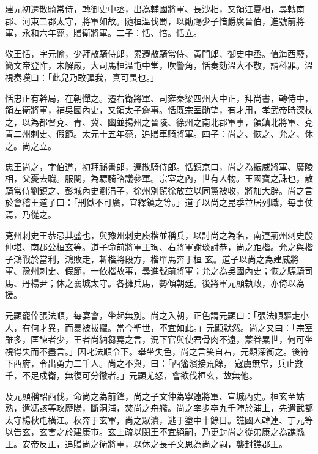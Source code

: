 \begin{pinyinscope}
 建元初遷散騎常侍，轉御史中丞，出為輔國將軍、長沙相，又領江夏相，尋轉南郡、河東二郡太守，將軍如故。隨桓溫伐蜀，以勛賜少子愔爵廣晉伯，進號前將軍，永和六年薨，贈衛將軍。二子：恬、愔。恬立。



 敬王恬，字元愉，少拜散騎侍郎，累遷散騎常侍、黃門郎、御史中丞。值海西廢，簡文帝登阼，未解嚴，大司馬桓溫屯中堂，吹警角，恬奏劾溫大不敬，請科罪。溫視奏嘆曰：「此兒乃敢彈我，真可畏也。」



 恬忠正有幹局，在朝憚之。遷右衛將軍、司雍秦梁四州大中正，拜尚書，轉侍中，領左衛將軍，補吳國內史，又領太子詹事。恬既宗室勛望，有才用，孝武帝時深杖之，以為都督兗、青、冀、幽並揚州之晉陵、徐州之南北郡軍事，領鎮北將軍、兗青二州刺史、假節。太元十五年薨，追贈車騎將軍。四子：尚之、恢之、允之、休之。尚之立。



 忠王尚之，字伯道，初拜祕書郎，遷散騎侍郎。恬鎮京口，尚之為振威將軍、廣陵相，父憂去職。服闋，為驃騎諮議參軍。宗室之內，世有人物。王國寶之誅也，散騎常侍劉鎮之、彭城內史劉涓子，徐州別駕徐放並以同黨被收，將加大辟。尚之言於會稽王道子曰：「刑獄不可廣，宜釋鎮之等。」道子以尚之昆季並居列職，每事仗焉，乃從之。



 兗州刺史王恭忌其盛也，與豫州刺史庾楷並稱兵，以討尚之為名，南連荊州刺史殷仲堪、南郡公桓玄等。道子命前將軍王珣、右將軍謝琰討恭，尚之距楷。允之與楷子鴻戰於當利，鴻敗走，斬楷將段方，楷單馬奔于桓
 玄。道子以尚之為建威將軍、豫州刺史、假節，一依楷故事，尋進號前將軍；允之為吳國內史；恢之驃騎司馬、丹楊尹；休之襄城太守。各擁兵馬，勢傾朝廷。後將軍元顯執政，亦倚以為援。



 元顯寵倖張法順，每宴會，坐起無別。尚之入朝，正色謂元顯曰：「張法順驅走小人，有何才異，而暴被拔擢。當今聖世，不宜如此。」元顯默然。尚之又曰：「宗室雖多，匡諫者少，王者尚納芻蕘之言，況下官與使君骨肉不遠，蒙眷累世，何可坐視得失而不盡言。」因叱法順令下。舉坐失色，尚之言笑自若，元顯深銜之。後符下西府，令出勇力二千人。尚之不與，曰：「西籓濱接荒餘，
 寇虜無常，兵止數千，不足戍衛，無復可分徹者。」元顯尤怒，會欲伐桓玄，故無他。



 及元顯稱詔西伐，命尚之為前鋒，尚之子文仲為寧遠將軍、宣城內史。桓玄至姑熟，遣馮該等攻歷陽，斷洞浦，焚尚之舟艦。尚之率步卒九千陣於浦上，先遣武都太守楊秋屯橫江。秋奔于玄軍，尚之眾潰，逃于塗中十餘日。譙國人韓連、丁元等以告玄，玄害之於建康市。玄上疏以閔王不宜絕嗣，乃更封尚之從弟康之為譙縣王。安帝反正，追贈尚之衛將軍，以休之長子文思為尚之嗣，襲封譙郡王。




\end{pinyinscope}
